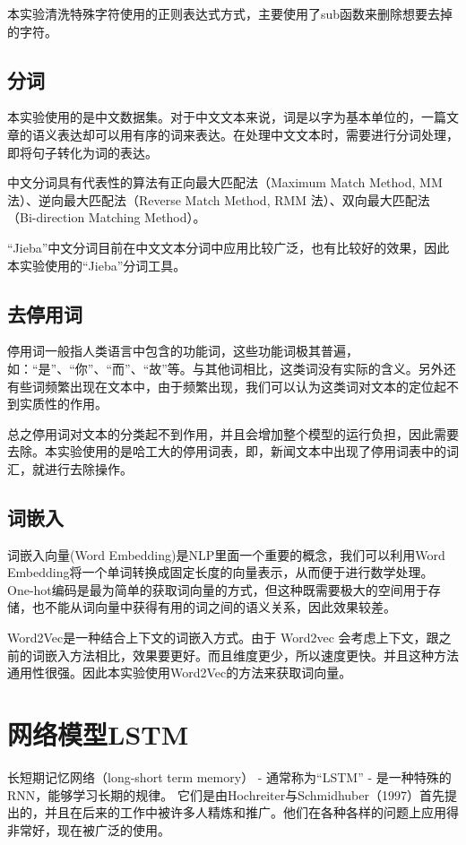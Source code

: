 \documentclass[twocolumn]{ctexart}
\begin{document}
\par 本实验清洗特殊字符使用的正则表达式方式，主要使用了sub函数来删除想要去掉的字符。

\subsection{分词}
\par 本实验使用的是中文数据集。对于中文文本来说，词是以字为基本单位的，一篇文章的语义表达却可以用有序的词来表达。在处理中文文本时，需要进行分词处理，即将句子转化为词的表达。
\par 中文分词具有代表性的算法有正向最大匹配法（Maximum Match Method, MM 法）、逆向最大匹配法（Reverse Match Method, RMM 法）、双向最大匹配法（Bi-direction Matching Method）。
\par “Jieba”中文分词目前在中文文本分词中应用比较广泛，也有比较好的效果，因此本实验使用的“Jieba”分词工具。

\subsection{去停用词}
\par 停用词一般指人类语言中包含的功能词，这些功能词极其普遍，如：“是”、“你”、“而”、“故”等。与其他词相比，这类词没有实际的含义。另外还有些词频繁出现在文本中，由于频繁出现，我们可以认为这类词对文本的定位起不到实质性的作用。

\par 总之停用词对文本的分类起不到作用，并且会增加整个模型的运行负担，因此需要去除。本实验使用的是哈工大的停用词表，即，新闻文本中出现了停用词表中的词汇，就进行去除操作。

\subsection{词嵌入}
\par 词嵌入向量(Word Embedding)是NLP里面一个重要的概念，我们可以利用Word Embedding将一个单词转换成固定长度的向量表示，从而便于进行数学处理。One-hot编码是最为简单的获取词向量的方式，但这种既需要极大的空间用于存储，也不能从词向量中获得有用的词之间的语义关系，因此效果较差。

\par Word2Vec是一种结合上下文的词嵌入方式。由于 Word2vec 会考虑上下文，跟之前的词嵌入方法相比，效果要更好。而且维度更少，所以速度更快。并且这种方法通用性很强。因此本实验使用Word2Vec的方法来获取词向量。

\section{网络模型LSTM}
\par 长短期记忆网络（long-short term memory） - 通常称为“LSTM” - 是一种特殊的RNN，能够学习长期的规律。 它们是由Hochreiter与Schmidhuber（1997）首先提出的，并且在后来的工作中被许多人精炼和推广。他们在各种各样的问题上应用得非常好，现在被广泛的使用。
\end{document}
